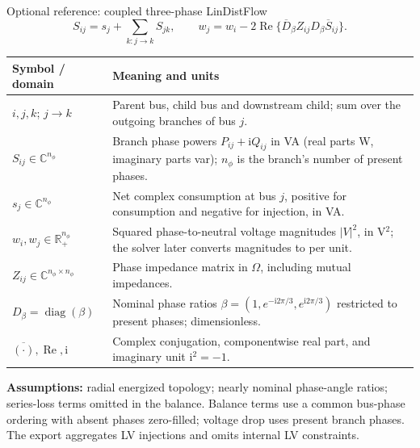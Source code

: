 \begin{frame}[t]{Optional reference: coupled three-phase LinDistFlow}
\[
S_{ij}=s_j+\sum_{k:j\to k}S_{jk},\qquad
w_j=w_i-2\operatorname{Re}\{\overline D_\beta Z_{ij}D_\beta\overline S_{ij}\}.
\]
\begin{tabular}{@{}>{\raggedright\arraybackslash}p{.24\linewidth}>{\raggedright\arraybackslash}p{.69\linewidth}@{}}
\toprule Symbol / domain & Meaning and units \\
\midrule
$i,j,k$; $j\to k$ & Parent bus, child bus and downstream child; sum over the outgoing branches of bus $j$. \\
$S_{ij}\in\mathbb C^{n_\phi}$ & Branch phase powers $P_{ij}+\mathrm{i}Q_{ij}$ in VA (real parts W, imaginary parts var); $n_\phi$ is the branch's number of present phases. \\
$s_j\in\mathbb C^{n_\phi}$ & Net complex consumption at bus $j$, positive for consumption and negative for injection, in VA. \\
$w_i,w_j\in\mathbb R_+^{n_\phi}$ & Squared phase-to-neutral voltage magnitudes $|V|^2$, in V$^2$; the solver later converts magnitudes to per unit. \\
$Z_{ij}\in\mathbb C^{n_\phi\times n_\phi}$ & Phase impedance matrix in $\Omega$, including mutual impedances. \\
$D_\beta=\operatorname{diag}(\beta)$ & Nominal phase ratios $\beta=(1,e^{-\mathrm{i}2\pi/3},e^{\mathrm{i}2\pi/3})$ restricted to present phases; dimensionless. \\
$\overline{(\cdot)},\operatorname{Re},\mathrm{i}$ & Complex conjugation, componentwise real part, and imaginary unit $\mathrm{i}^2=-1$. \\
\bottomrule
\end{tabular}
\par\smallskip\textbf{Assumptions:} radial energized topology; nearly nominal phase-angle ratios; series-loss terms omitted in the balance. Balance terms use a common bus-phase ordering with absent phases zero-filled; voltage drop uses present branch phases. The export aggregates LV injections and omits internal LV constraints.
\end{frame}

